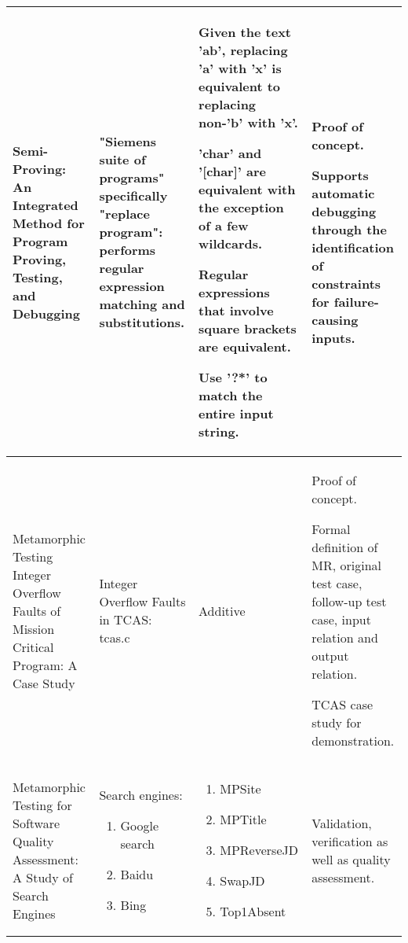 \begin{singlespace}
\begin{longtable}[c]{| p{3cm} | p{4cm} | p{3.5cm} | p{4cm} |}
  Semi-Proving: An Integrated Method for Program Proving, Testing, and Debugging             &
  "Siemens suite of programs" specifically "replace program": performs regular expression matching and substitutions.                                                                           &
  Given the text 'ab', replacing 'a' with 'x' is equivalent to replacing non-'b' with 'x'. \par\medskip
  'char' and '[char]' are equivalent with the exception of a few wildcards. \par\medskip
  Regular expressions that involve square brackets are equivalent. \par\medskip
  Use '?*' to match the entire input string.                                                             &
  Proof of concept. \par\medskip
  Supports automatic debugging through the identification of constraints for failure-causing inputs.
  \\

  \hline

  Metamorphic Testing Integer Overflow Faults of Mission Critical Program: A Case Study             &
  Integer Overflow Faults in TCAS: tcas.c                                                                           &
  Additive                                                            &
  Proof of concept. \par\medskip
  Formal definition of MR, original test case, follow-up test case, input relation and output relation. \par\medskip
  TCAS case study for demonstration.
  \\

  \hline
  Metamorphic Testing for Software Quality Assessment: A Study of Search Engines             &
  Search engines:
  \begin{enumerate}
    \item Google search
    \item Baidu
    \item Bing
  \end{enumerate}                                                                        &
  \begin{enumerate}
    \item MPSite
    \item MPTitle
    \item MPReverseJD
    \item SwapJD
    \item Top1Absent
  \end{enumerate}                                                         &
  Validation, verification as well as quality assessment.
  \\


\end{longtable}
\end{singlespace}
